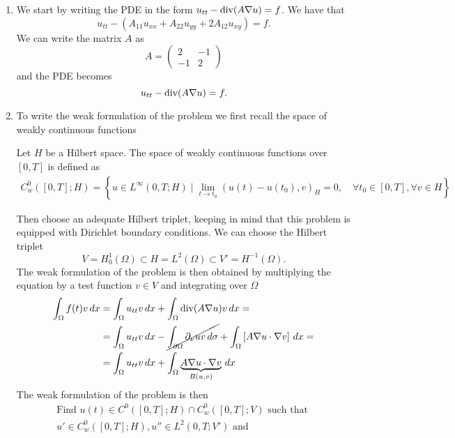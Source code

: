 \begin{enumerate}
    \item We start by writing the PDE in the form \(u_{tt} - \text{div}(A \nabla u) = f\). We have that
    \[
        u_{tt} - \left(A_{11} u_{xx} + A_{22} u_{yy} + 2A_{12} u_{xy}\right) = f.
    \]
    We can write the matrix \(A\) as
    \[
        A = \begin{pmatrix}
            2 & -1 \\
            -1 & 2
        \end{pmatrix}
    \]
    and the PDE becomes
    \[
        u_{tt} - \text{div} (A \nabla u) = f.
    \]
    \item To write the weak formulation of the problem we first recall the space of weakly continuous functions
    \begin{remark}
        Let \(H\) be a Hilbert space. The space of weakly continuous functions over \([0, T]\) is defined as
        \[
            \begin{split}
                C_w^0([0, T]; H) = \left\{ u \in L^\infty(0, T; H) \mid \lim_{t \to t_0} (u(t) - u(t_0), v)_H = 0, \quad \forall t_0 \in [0, T], \forall v \in H \right\}
            \end{split}
        \] 
    \end{remark}
    Then choose an adequate Hilbert triplet, keeping in mind that this problem is equipped with Dirichlet boundary conditions. We can choose the Hilbert triplet
    \[
        V = H^1_0(\Omega) \subset H = L^2(\Omega) \subset V' = H^{-1}(\Omega).
    \]
    The weak formulation of the problem is then obtained by multiplying the equation by a test function \(v \in V\) and integrating over \(\Omega\)
    \begin{align*}
        \int_\Omega f(t) v \, dx &= \int_\Omega u_{tt} v \, dx + \int_\Omega \text{div}(A \nabla u)v \, dx =\\
        &= \int_\Omega u_{tt} v \, dx - \cancel{\int_{\partial\Omega} \partial_\nu u v \, d\sigma} + \int_\Omega \left[A \nabla u \cdot \nabla v\right] \, dx = \\
        &= \int_\Omega u_{tt} v \, dx + \int_\Omega \underbrace{A \nabla u \cdot \nabla v}_{B(u, v)} \, dx
    \end{align*}
    The weak formulation of the problem is then
    \[
        \begin{split}
            \text{Find } u(t) \in C^0([0, T]; H) \cap C_w^0([0, T]; V) \text{ such that } \\
            u' \in C_w^0([0, T]; H), u'' \in L^2(0, T; V') \text{ and } \\

\end{split}\]
\end{enumerate}
